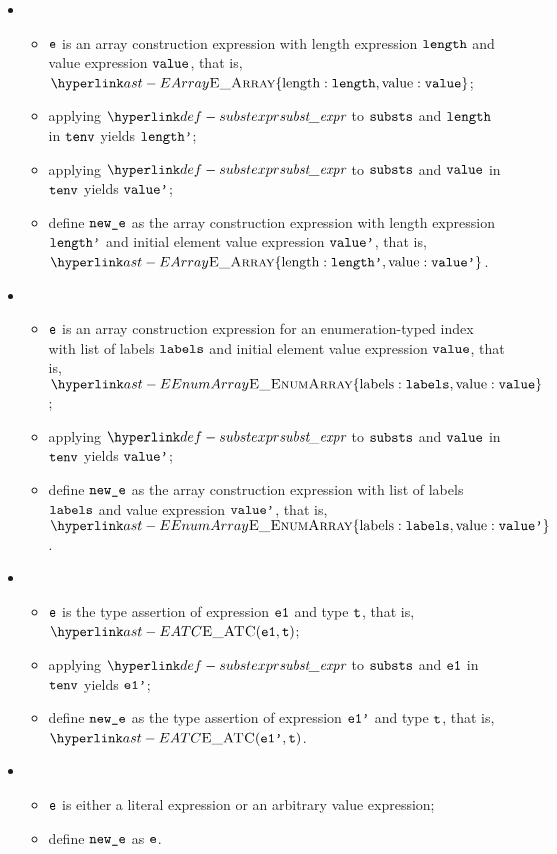 \begin{itemize}
  \item {}
  \begin{itemize}
    \item $\texttt{e}$ is an array construction expression with length expression $\texttt{length}$ and value expression $\texttt{value}$, that is,
          $\EArray\{\EArrayLength: \length, \EArrayValue: \vvalue\}$;
    \item applying $\substexpr$ to $\texttt{substs}$ and $\texttt{length}$ in $\texttt{tenv}$ yields $\texttt{length'}$;
    \item applying $\substexpr$ to $\texttt{substs}$ and $\texttt{value}$ in $\texttt{tenv}$ yields $\texttt{value'}$;
    \item define $\texttt{new\_e}$ as the array construction expression with length expression \\
          $\texttt{length'}$ and initial element value expression $\texttt{value'}$, that is, \\
          $\EArray\{\EArrayLength: \lengthp, \EArrayValue: \vvaluep\}$.
  \end{itemize}

  \item {}
  \begin{itemize}
    \item $\texttt{e}$ is an array construction expression for an enumeration-typed index
          with list of labels $\texttt{labels}$ and initial element value expression $\texttt{value}$, that is, \\
          $\EEnumArray\{\EArrayLabels: \vlabels, \EArrayValue: \vvalue\}$;
    \item applying $\substexpr$ to $\texttt{substs}$ and $\texttt{value}$ in $\texttt{tenv}$ yields $\texttt{value'}$;
    \item define $\texttt{new\_e}$ as the array construction expression with list of labels $\texttt{labels}$
          and value expression $\texttt{value'}$, that is,
          $\EEnumArray\{\EArrayLabels: \vlabels, \EArrayValue: \vvaluep\}$.
  \end{itemize}

  \item {}
  \begin{itemize}
    \item $\texttt{e}$ is the type assertion of expression $\texttt{e1}$ and type $\texttt{t}$, that is, $\EATC(\veone, \vt)$;
    \item applying $\substexpr$ to $\texttt{substs}$ and $\texttt{e1}$ in $\texttt{tenv}$ yields $\texttt{e1'}$;
    \item define $\texttt{new\_e}$ as the type assertion of expression $\texttt{e1'}$ and type $\texttt{t}$, that is, $\EATC(\veonep, \vt)$.
  \end{itemize}

  \item {}
  \begin{itemize}
    \item $\texttt{e}$ is either a literal expression or an arbitrary value expression;
    \item define $\texttt{new\_e}$ as $\texttt{e}$.
  \end{itemize}
\end{itemize}

